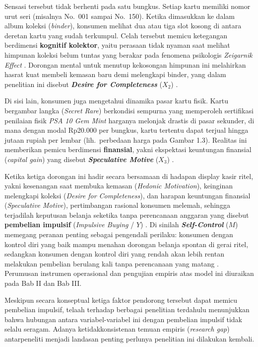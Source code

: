 \documentclass[12pt,a4paper]{article}
\numberwithin{equation}{section}
\numberwithin{table}{section}
\numberwithin{figure}{section}
\begin{document}
Sensasi tersebut tidak berhenti pada satu bungkus. Setiap kartu memiliki nomor urut seri (misalnya No.~001 sampai No.~150). Ketika dimasukkan ke dalam album koleksi (\emph{binder}), konsumen melihat dua atau tiga slot kosong di antara deretan kartu yang sudah terkumpul. Celah tersebut memicu ketegangan berdimensi \textbf{kognitif kolektor}, yaitu perasaan tidak nyaman saat melihat himpunan koleksi belum tuntas yang berakar pada fenomena psikologis \emph{Zeigarnik Effect} \citep{zeigarnik1927behalten, barasz2017pseudo, belk1995collecting}. Dorongan mental untuk menutup kekosongan himpunan ini melahirkan hasrat kuat membeli kemasan baru demi melengkapi binder, yang dalam penelitian ini disebut \textbf{\emph{Desire for Completeness}} ($X_2$) \citep{gao2014completing}.

Di sisi lain, konsumen juga mengetahui dinamika pasar kartu fisik. Kartu bergambar langka (\emph{Secret Rare}) berkondisi sempurna yang memperoleh sertifikasi penilaian fisik \emph{PSA 10 Gem Mint} harganya melonjak drastis di pasar sekunder, di mana dengan modal Rp20.000 per bungkus, kartu tertentu dapat terjual hingga jutaan rupiah per lembar (lih.\ perbedaan harga pada Gambar 1.3). Realitas ini memberikan pemicu berdimensi \textbf{finansial}, yakni ekspektasi keuntungan finansial (\emph{capital gain}) yang disebut \textbf{\emph{Speculative Motive}} ($X_3$) \citep{baur2018bitcoin, colline2024biases, shiller2000irrational}.

Ketika ketiga dorongan ini hadir secara bersamaan di hadapan display kasir ritel, yakni kesenangan saat membuka kemasan (\emph{Hedonic Motivation}), keinginan melengkapi koleksi (\emph{Desire for Completeness}), dan harapan keuntungan finansial (\emph{Speculative Motive}), pertimbangan rasional konsumen melemah, sehingga terjadilah keputusan belanja seketika tanpa perencanaan anggaran yang disebut \textbf{pembelian impulsif} (\emph{Impulsive Buying} / $Y$) \citep{rook1987buying}. Di sinilah \textbf{\emph{Self-Control}} ($M$) memegang peranan penting sebagai pengendali perilaku: konsumen dengan kontrol diri yang baik mampu menahan dorongan belanja spontan di gerai ritel, sedangkan konsumen dengan kontrol diri yang rendah akan lebih rentan melakukan pembelian berulang kali tanpa perencanaan yang matang \citep{tangney2004high, baumeister2002yield}. Perumusan instrumen operasional dan pengujian empiris atas model ini diuraikan pada Bab II dan Bab III.

Meskipun secara konseptual ketiga faktor pendorong tersebut dapat memicu pembelian impulsif, telaah terhadap berbagai penelitian terdahulu menunjukkan bahwa hubungan antara variabel-variabel ini dengan pembelian impulsif tidak selalu seragam. Adanya ketidakkonsistenan temuan empiris (\emph{research gap}) antarpeneliti menjadi landasan penting perlunya penelitian ini dilakukan kembali.
\end{document}
